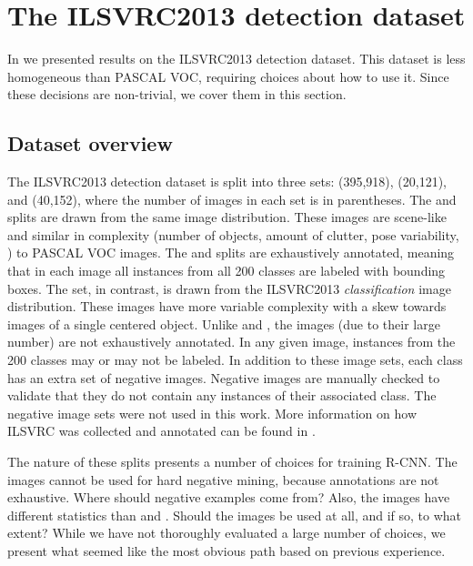 \section{The ILSVRC2013 detection dataset}
In  we presented results on the ILSVRC2013 detection dataset.
This dataset is less homogeneous than PASCAL VOC, requiring choices about how to use it.
Since these decisions are non-trivial, we cover them in this section.

\subsection{Dataset overview}
The ILSVRC2013 detection dataset is split into three sets: \train (395,918), \val (20,121), and \test (40,152), where the number of images in each set is in parentheses.
The \val and \test splits are drawn from the same image distribution.
These images are scene-like and similar in complexity (number of objects, amount of clutter, pose variability, \etc) to PASCAL VOC images.
The \val and \test splits are exhaustively annotated, meaning that in each image all instances from all 200 classes are labeled with bounding boxes.
The \train set, in contrast, is drawn from the ILSVRC2013 \emph{classification} image distribution.
These images have more variable complexity with a skew towards images of a single centered object.
Unlike \val and \test, the \train images (due to their large number) are not exhaustively annotated.
In any given \train image, instances from the 200 classes may or may not be labeled.
In addition to these image sets, each class has an extra set of negative images.
Negative images are manually checked to validate that they do not contain any instances of their associated class.
The negative image sets were not used in this work.
More information on how ILSVRC was collected and annotated can be found in \cite{DengCHI14,HJL_AAAI12}.

The nature of these splits presents a number of choices for training R-CNN.
The \train images cannot be used for hard negative mining, because annotations are not exhaustive.
Where should negative examples come from?
Also, the \train images have different statistics than \val and \test.
Should the \train images be used at all, and if so, to what extent?
While we have not thoroughly evaluated a large number of choices, we present what seemed like the most obvious path based on previous experience.

